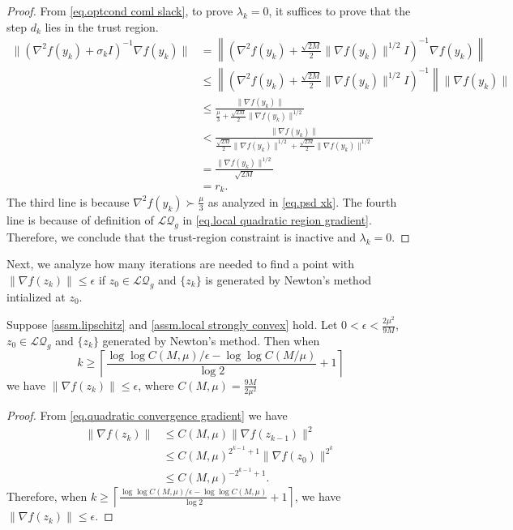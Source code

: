 \documentclass{article}
\begin{document}
\begin{proof}
    From \eqref{eq.optcond coml slack}, to prove $\lambda_k=0$, it suffices to prove that the step $d_k$ lies in the trust region.
    \begin{equation*}
        \begin{aligned}
            \|(\nabla^2 f(y_k)+\sigma_k I)^{-1}\nabla f(y_k)\|&= \left\|\left (\nabla^2 f(y_k)+\frac{\sqrt{2M}}{2} \|\nabla f(y_k)\|^{1/2} I\right)^{-1}\nabla f(y_k)\right\|\\
            &\leq \left\|\left (\nabla^2 f(y_k)+\frac{\sqrt{2M}}{2} \|\nabla f(y_k)\|^{1/2} I\right)^{-1}\right\| \|\nabla f(y_k)\|\\
            &\leq \frac{\|\nabla f(y_k)\|}{\frac{\mu}{3}+\frac{\sqrt{2M}}{2} \|\nabla f(y_k)\|^{1/2}}\\
            &<\frac{\|\nabla f(y_k)\|}{\frac{\sqrt{2M}}{2}\|\nabla f(y_k)\|^{1/2}+\frac{\sqrt{2M}}{2} \|\nabla f(y_k)\|^{1/2}}\\
            &=\frac{\|\nabla f(y_k)\|^{1/2}}{\sqrt{2M}}\\
            &=r_k.
        \end{aligned}
    \end{equation*}
    The third line is because $\nabla^2 f(y_k)\succ \frac{\mu}{3}$ as analyzed in \eqref{eq.psd xk}. The fourth line is because of definition of $\mathcal{LQ}_g$ in \eqref{eq.local quadratic region gradient}. Therefore, we conclude that the trust-region constraint is inactive and $\lambda_k=0$.
\end{proof}
Next, we analyze how many iterations are needed to find a point with $\|\nabla f(z_k)\|\leq \epsilon$ if $z_0 \in \mathcal{LQ}_g$ and $\{z_k\}$ is generated by Newton's method intialized at $z_0$.
\begin{corollary}
    \label{lem.number of iterations newton}
    Suppose \autoref{assm.lipschitz} and \autoref{assm.local strongly convex} hold. Let $0<\epsilon< \frac{2\mu^2}{9M}$, $z_0\in\mathcal{LQ}_g$ and $\{z_k\}$ generated by Newton's method. Then when
    \begin{equation}
        \label{eq.number of iterations newton}
        k\geq \left\lceil\frac{\log\log C(M,\mu)/\epsilon-\log\log C(M/\mu)}{\log2}+1\right\rceil
    \end{equation}
    we have $\|\nabla f(z_k)\|\leq \epsilon$, where $C(M,\mu) = \frac{9M}{2\mu^2}$
\end{corollary}
\begin{proof}
From \eqref{eq.quadratic convergence gradient} we have
    \begin{equation*}
        \begin{aligned}
            \|\nabla f(z_k)\|&\leq C(M,\mu)\|\nabla f(z_{k-1})\|^2\\
            &\leq C(M,\mu)^{2^{k-1}+1} \|\nabla f(z_0)\|^{2^k}\\
            &\leq C(M,\mu)^{-2^{k-1}+1}.
        \end{aligned}
    \end{equation*}
    Therefore, when $k\geq \left\lceil\frac{\log\log C(M,\mu)/\epsilon-\log\log C(M,\mu)}{\log2}+1\right\rceil$, we have $\|\nabla f(z_k)\|\leq \epsilon$.
\end{proof}
\end{document}
